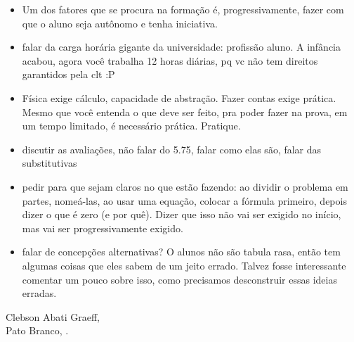 \begin{itemize}
\item Um dos fatores que se procura na formação é, progressivamente, fazer com que o aluno seja autônomo e tenha iniciativa.

\item falar da carga horária gigante da universidade: profissão aluno. A infância acabou, agora você trabalha 12 horas diárias, pq vc não tem direitos garantidos pela clt :P

\item Física exige cálculo, capacidade de abstração. Fazer contas exige prática. Mesmo que você entenda o que deve ser feito, pra poder fazer na prova, em um tempo limitado, é necessário prática. Pratique.

\item discutir as avaliações, não falar do 5.75, falar como elas são, falar das substitutivas

\item pedir para que sejam claros no que estão fazendo: ao dividir o problema em partes, nomeá-las, ao usar uma equação, colocar a fórmula primeiro, depois dizer o que é zero (e por quê). Dizer que isso não vai ser exigido no início, mas vai ser progressivamente exigido.

\item falar de concepções alternativas? O alunos não são tabula rasa, então tem algumas coisas que eles sabem de um jeito errado. Talvez fosse interessante comentar um pouco sobre isso, como precisamos desconstruir essas ideias erradas.


\end{itemize}

\vspace{1cm}
\begin{flushright}
Clebson Abati Graeff,\\
Pato Branco, \monthyear.
\end{flushright}

